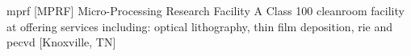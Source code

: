 \newglsXinstitution%
{mprf}%
[MPRF]%
{Micro{\--}Processing Research Facility}%
{A Class 100 cleanroom facility at  offering services including: optical lithography, thin film deposition, \gls{rie} and \gls{pecvd} \cite{website:Micro_Processing_Research_Facility}}%
[Knoxville, TN]%